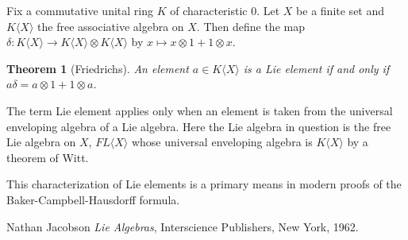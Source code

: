 \documentclass[12pt]{article}
\newtheorem{thm}{Theorem}
\begin{document}
Fix a commutative unital ring $K$ of characteristic 0.  Let $X$ be a finite
set and $K\langle X\rangle$ the free associative algebra on $X$.  Then define
the map $\delta:K\langle X\rangle\rightarrow K\langle X\rangle\otimes K\langle X\rangle$ by $x\mapsto x\otimes 1+1\otimes x$.

\begin{thm}[Friedrichs]\cite[Thm V.9]{Jacobson}
An element $a\in K\langle X\rangle$ is a Lie element if and only if
$a\delta=a\otimes 1+1\otimes a$.
\end{thm}

The term Lie element applies only when an element is taken from the universal
enveloping algebra of a Lie algebra.  Here the Lie algebra in question is
the free Lie algebra on $X$, $FL\langle X\rangle$ whose universal enveloping 
algebra is $K\langle X\rangle$ by a theorem of Witt.

This characterization of Lie elements is a primary means in modern proofs
of the Baker-Campbell-Hausdorff formula.


\begin{thebibliography}{10}
Nathan Jacobson \emph{Lie Algebras}, Interscience Publishers, New York, 1962.

\end{thebibliography}

\end{document}
